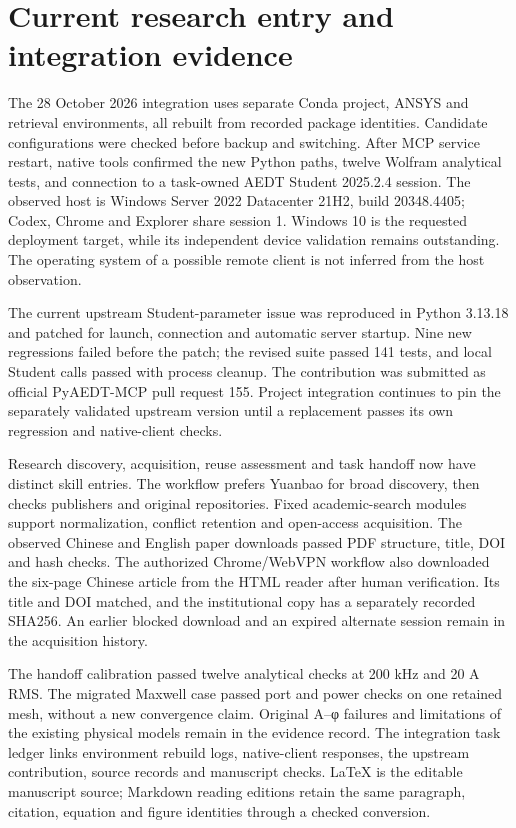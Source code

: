 \section{Current research entry and integration evidence}
\label{chapter:13}

\hypertarget{13.runtime}{}
The 28 October 2026 integration uses separate Conda project, ANSYS and retrieval environments, all rebuilt from recorded package identities. Candidate configurations were checked before backup and switching. After MCP service restart, native tools confirmed the new Python paths, twelve Wolfram analytical tests, and connection to a task-owned AEDT Student 2025.2.4 session. The observed host is Windows Server 2022 Datacenter 21H2, build 20348.4405; Codex, Chrome and Explorer share session 1. Windows 10 is the requested deployment target, while its independent device validation remains outstanding. The operating system of a possible remote client is not inferred from the host observation.

\hypertarget{13.contribution}{}
The current upstream Student-parameter issue was reproduced in Python 3.13.18 and patched for launch, connection and automatic server startup. Nine new regressions failed before the patch; the revised suite passed 141 tests, and local Student calls passed with process cleanup. The contribution was submitted as official PyAEDT-MCP pull request 155. Project integration continues to pin the separately validated upstream version until a replacement passes its own regression and native-client checks. \cite{PYAEDTMCP}

\hypertarget{13.discovery}{}
Research discovery, acquisition, reuse assessment and task handoff now have distinct skill entries. The workflow prefers Yuanbao for broad discovery, then checks publishers and original repositories. Fixed academic-search modules support normalization, conflict retention and open-access acquisition. The observed Chinese and English paper downloads passed PDF structure, title, DOI and hash checks. The authorized Chrome/WebVPN workflow also downloaded the six-page Chinese article from the HTML reader after human verification. Its title and DOI matched, and the institutional copy has a separately recorded SHA256. An earlier blocked download and an expired alternate session remain in the acquisition history. \cite{ACADEMICSEARCH,C01,ZHU2026}

\hypertarget{13.evidence}{}
The handoff calibration passed twelve analytical checks at 200 kHz and 20 A RMS. The migrated Maxwell case passed port and power checks on one retained mesh, without a new convergence claim. Original A–φ failures and limitations of the existing physical models remain in the evidence record. The integration task ledger links environment rebuild logs, native-client responses, the upstream contribution, source records and manuscript checks. LaTeX is the editable manuscript source; Markdown reading editions retain the same paragraph, citation, equation and figure identities through a checked conversion.
